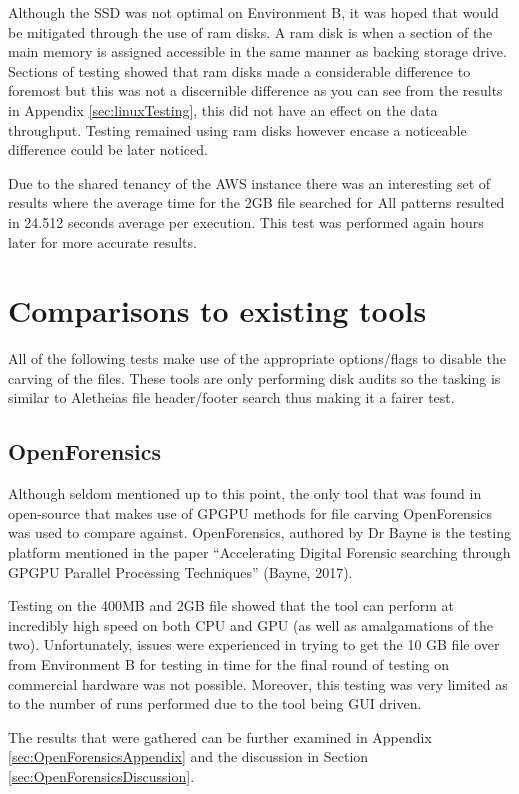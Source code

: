Although the \ac{SSD} was not optimal on Environment B, it was hoped that would be mitigated through the use of ram disks.
A ram disk is when a section of the main memory is assigned accessible in the same manner as backing storage drive.
Sections of testing showed that ram disks made a considerable difference to foremost but this was not a discernible difference as you can see from the results in Appendix \ref{sec:linuxTesting}, this did not have an effect on the data throughput.
Testing remained using ram disks however encase a noticeable difference could be later noticed.

Due to the shared tenancy of the \ac{AWS} instance there was an interesting set of results where the average time for the 2GB file searched for All patterns resulted in 24.512 seconds average per execution.
This test was performed again hours later for more accurate results.

\section{Comparisons to existing tools}
All of the following tests make use of the appropriate options/flags to disable the carving of the files.
These tools are only performing disk audits so the tasking is similar to Aletheias file header/footer search thus making it a fairer test.

\subsection{OpenForensics}
\label{sec:OpenForensicsComparison}
Although seldom mentioned up to this point, the only tool that was found in open-source that makes use of \ac{GPGPU} methods for file carving OpenForensics was used to compare against.
OpenForensics, authored by Dr Bayne is the testing platform mentioned in the paper ``Accelerating Digital Forensic searching through \ac{GPGPU} Parallel Processing Techniques'' (Bayne, 2017).

Testing on the 400\ac{MB} and 2\ac{GB} file showed that the tool can perform at incredibly high speed on both \ac{CPU} and \ac{GPU} (as well as amalgamations of the two).
Unfortunately, issues were experienced in trying to get the 10 \ac{GB} file over from Environment B for testing in time for the final round of testing on commercial hardware was not possible.
Moreover, this testing was very limited as to the number of runs performed due to the tool being GUI driven.

The results that were gathered can be further examined in Appendix \ref{sec:OpenForensicsAppendix} and the discussion in Section \ref{sec:OpenForensicsDiscussion}.


